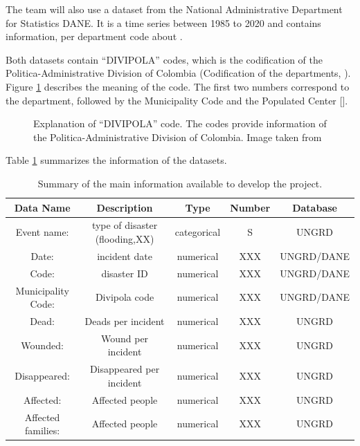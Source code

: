 \documentclass[11pt]{article}
\begin{document}
The team will also use a dataset from the National Administrative Department for Statistics DANE. It is a time series between 1985 to 2020 and contains information, per department code about \cite{DANE} .

Both datasets contain ``DIVIPOLA'' codes, which is the codification of the Politica-Administrative Division of Colombia (Codification of the departments, ). Figure \ref{fig:divipola} describes the meaning of the code. The first two numbers correspond to the department, followed by the Municipality Code and the Populated Center [\cite{divipola}].


\begin{figure}[!ht]
        \caption{Explanation of ``DIVIPOLA'' code. The codes provide information of the Politica-Administrative Division of Colombia. Image taken from \cite{divipola}}
        \label{fig:divipola}
      \end{figure}


Table \ref{tabDataset} summarizes the information of the datasets.

\begin{table}[h]
\begin{center}
\label{tabDataset}
\begin{tabular}{|c|c|c|c|c|}
\hline
\textbf{Data Name} & \textbf{Description} & \textbf{Type} & \textbf{Number} & \textbf{Database}   \\
\hline
 Event name: & type of disaster (flooding,XX)& categorical &S &  UNGRD\\
 Date: & incident date & numerical &XXX &  UNGRD/DANE  \\
 Code: &disaster ID & numerical &XXX &  UNGRD/DANE  \\
 Municipality Code: & Divipola code & numerical &XXX &  UNGRD/DANE  \\
 Dead: & Deads per incident & numerical &XXX &  UNGRD  \\
 Wounded: & Wound per incident & numerical &XXX &  UNGRD  \\
 Disappeared: & Disappeared per incident & numerical &XXX &  UNGRD  \\
  Affected: & Affected people & numerical &XXX &  UNGRD  \\
   Affected families: & Affected people & numerical &XXX &  UNGRD  \\
\hline
\end{tabular}
 \caption{Summary of the main information available to develop the project.}
\end{center}
\end{table}
\end{document}
